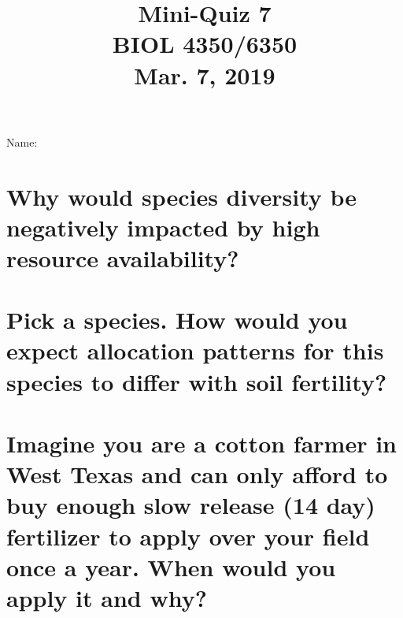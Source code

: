 \documentclass[12pt, notitlepage]{article}   	%
\title{
	\textbf{
		Mini-Quiz 7
	} \\
	\large BIOL 4350/6350 \\
	\large Mar. 7, 2019 \\
}
\date{\vspace{-5ex}}
\def\wl{\par \vspace{\baselineskip}}
\begin{document}
{\selectfont %

\large{Name:}

{\let\newpage\relax\maketitle}

\section{\small{Why would species diversity be negatively impacted by high resource
availability?}}
\wl
\wl
\wl
\wl
\wl
\wl
\wl
\wl
\wl
\wl

\section{\small{Pick a species. How would you expect allocation patterns for this
species to differ with soil fertility?}}

\newpage

\section{\small{Imagine you are a cotton farmer in West Texas and can only afford to
buy enough slow release (14 day) fertilizer to apply over your field once a year.
When would you apply it and why?}}

} %
\end{document}
